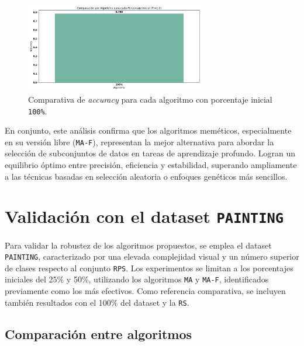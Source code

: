 \begin{figure}[htp]
    \centering
    \includegraphics[width=0.7\textwidth]{imagenes/evaluaciones/final/barplot-por-pi/pi-100.png}
    \caption{Comparativa de \textit{accuracy} para cada algoritmo con porcentaje inicial \texttt{100\%}.}
    \label{fig:barplot-por-pi-100}
\end{figure}

En conjunto, este análisis confirma que los algoritmos meméticos, especialmente en su versión libre (\texttt{MA-F}),
representan la mejor alternativa para abordar la selección de subconjuntos de datos en tareas de aprendizaje profundo.
Logran un equilibrio óptimo entre precisión, eficiencia y estabilidad, superando ampliamente a las técnicas basadas en selección aleatoria o enfoques genéticos más sencillos.


\section{Validación con el dataset \texttt{PAINTING}}\label{sec:validacion-con-painting}
Para validar la robustez de los algoritmos propuestos, se emplea el dataset \texttt{PAINTING},
caracterizado por una elevada complejidad visual y un número superior de clases respecto al conjunto \texttt{RPS}.
Los experimentos se limitan a los porcentajes iniciales del 25\% y 50\%, utilizando los algoritmos \texttt{MA} y \texttt{MA-F}, identificados previamente como los más efectivos.
Como referencia comparativa, se incluyen también resultados con el 100\% del dataset y la \texttt{RS}.

\subsection{Comparación entre algoritmos}

